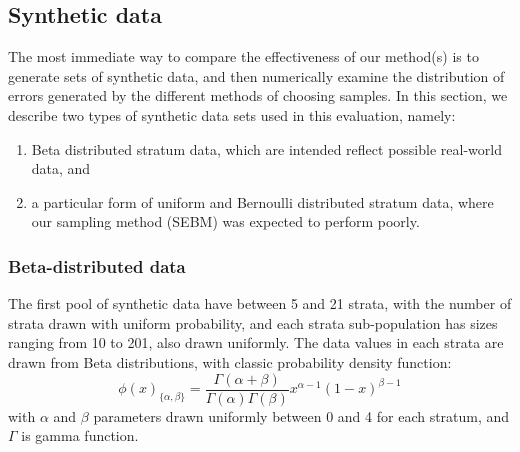 \subsection{Synthetic data}
\label{ssec:SyntheticDists}
The most immediate way to compare the effectiveness of our method(s) is to generate sets of synthetic data, and then numerically examine the distribution of errors generated by the different methods of choosing samples.
In this section, we describe two types of synthetic data sets used in this evaluation, namely:
\begin{enumerate}
\item Beta distributed stratum data, which are intended reflect possible real-world data, and 
\item a particular form of uniform and Bernoulli distributed stratum data, where our sampling method (SEBM) was expected to perform poorly.
\end{enumerate}

\subsubsection{Beta-distributed data}\label{sec:beta_distributed_data}
The first pool of synthetic data %
have between 5 and 21 strata, with the number of strata drawn with uniform probability, 
and each strata sub-population has sizes ranging from 10 to 201, also drawn uniformly.
The data values in each strata are drawn from Beta distributions, with classic probability density function:
$$\phi(x)_{\{\alpha,\beta\}}
=\frac{\Gamma(\alpha+\beta)}{\Gamma(\alpha)\Gamma(\beta)}     
    x^{\alpha-1}(1-x)^{\beta-1} $$
with $\alpha$ and $\beta$ parameters drawn uniformly between 0 and 4 for each stratum, and $\Gamma$ is \DIFaddbegin {}\DIFaddend gamma function.








